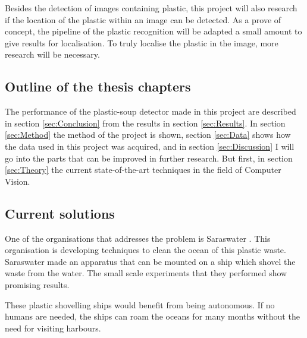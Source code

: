 Besides the detection of images containing plastic, this project will also research if the location of the plastic within an image can be detected.
As a prove of concept, the pipeline of the plastic recognition will be adapted a small amount to give results for localisation.
To truly localise the plastic in the image, more research will be necessary.

\subsection{Outline of the thesis chapters}
\label{sec:Intro-Outline}
The performance of the plastic-soup detector made in this project are described in section \ref{sec:Conclusion} from the results in section \ref{sec:Results}.
In section \ref{sec:Method} the method of the project is shown, section \ref{sec:Data} shows how the data used in this project was acquired, and in section \ref{sec:Discussion} I will go into the parts that can be improved in further research.
But first, in section \ref{sec:Theory} the current state-of-the-art techniques in the field of Computer Vision.















\iffalse



\subsection{Current solutions}
\label{sec:Intro-Current}


One of the organisations that addresses the problem is Saraswater \citeneed.
This organisation is developing techniques to clean the ocean of this plastic waste.
Saraswater made an apparatus that can be mounted on a ship which shovel the waste from the water.
The small scale experiments that they performed show promising results.

These plastic shovelling ships would benefit from being autonomous.
If no humans are needed, the ships can roam the oceans for many months without the need for visiting harbours.

